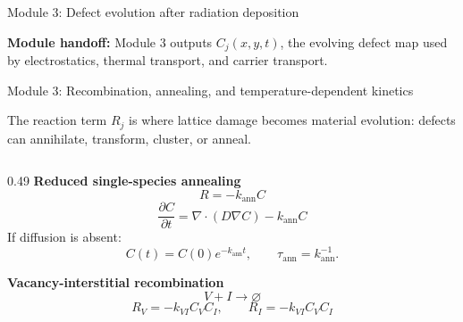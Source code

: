 \documentclass[aspectratio=169,8pt]{beamer}
\begin{document}
\begin{frame}{Module 3: Defect evolution after radiation deposition}
\vspace{0.5mm}
\begin{orangebox}
\centering\scriptsize
\textbf{Module handoff:} Module 3 outputs $C_j(x,y,t)$, the evolving defect map used by electrostatics, thermal transport, and carrier transport.
\end{orangebox}
\end{frame}

\begin{frame}{Module 3: Recombination, annealing, and temperature-dependent kinetics}
\scriptsize
\vspace{-1mm}
\begin{bluebox}
\centering\small
The reaction term $R_j$ is where lattice damage becomes material evolution: defects can annihilate, transform, cluster, or anneal.
\end{bluebox}

\vspace{1mm}
\begin{columns}[T,totalwidth=\textwidth]
\begin{column}{0.49\textwidth}
\textbf{Reduced single-species annealing}
\begin{equation*}
\boxed{R=-k_{\mathrm{ann}}C}
\end{equation*}
\begin{equation*}
\boxed{\frac{\partial C}{\partial t}=\nabla\cdot(D\nabla C)-k_{\mathrm{ann}}C}
\end{equation*}
\scriptsize
If diffusion is absent:
\begin{equation*}
\boxed{C(t)=C(0)e^{-k_{\mathrm{ann}}t}},\qquad
\boxed{\tau_{\mathrm{ann}}=k_{\mathrm{ann}}^{-1}}.
\end{equation*}

\vspace{1mm}
\textbf{Vacancy-interstitial recombination}
\begin{equation*}
V+I\longrightarrow \varnothing
\end{equation*}
\begin{equation*}
\boxed{R_V=-k_{VI}C_VC_I,\qquad R_I=-k_{VI}C_VC_I}
\end{equation*}
\end{column}


\end{columns}
\end{frame}
\end{document}

